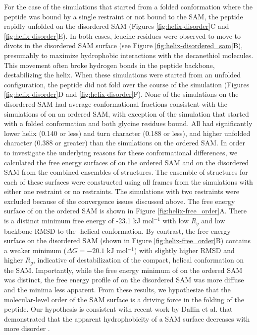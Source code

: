 For the case of the simulations that started from a folded conformation where the peptide was bound by a single restraint or not bound to the SAM, the peptide rapidly unfolded on the disordered SAM (Figures \ref{fig:helix-disorder}C and \ref{fig:helix-disorder}E). 
In both cases, leucine residues were observed to move to divots in the disordered SAM surface (see Figure \ref{fig:helix-disordered_sam}B), presumably to maximize hydrophobic interactions with the decanethiol molecules. 
This movement often broke hydrogen bonds in the peptide backbone, destabilizing the helix. 
When these simulations were started from an unfolded configuration, the peptide did not fold over the course of the simulation (Figures \ref{fig:helix-disorder}D and \ref{fig:helix-disorder}F). 
None of the simulations on the disordered SAM had average conformational fractions consistent with the simulations of \pep{} on an ordered SAM, with exception of the simulation that started with a folded conformation and both glycine residues bound. 
All had significantly lower helix (0.140 or less) and turn character (0.188 or less), and higher unfolded character (0.388 or greater) than the simulations on the ordered SAM. 
In order to investigate the underlying reasons for these conformational differences, we calculated the free energy surfaces of \pep{} on the ordered SAM and \pep{} on the disordered SAM from the combined ensembles of structures. 
The ensemble of structures for each of these surfaces were constructed using all frames from the simulations with either one restraint or no restraints. 
The simulations with two restraints were excluded because of the convergence issues discussed above. 
The free energy surface of \pep{} on the ordered SAM is shown in Figure \ref{fig:helix-free_order}A. 
There is a distinct minimum free energy of -23.1 kJ mol$^{-1}$ with low $R_g$ and low backbone RMSD to the \textalpha{}-helical conformation. 
By contrast, the free energy surface on the disordered SAM (shown in Figure \ref{fig:helix-free_order}B) contains a weaker minimum ($\Delta G = -20.1$ kJ mol$^{-1}$) with slightly higher RMSD and higher $R_g$, indicative of destabilization of the compact, helical conformation on the SAM. 
Importantly, while the free energy minimum of \pep{} on the ordered SAM was distinct, the free energy profile of \pep{} on the disordered SAM was more diffuse and the minima less apparent. 
From these results, we hypothesize that the molecular-level order of the SAM surface is a driving force in the folding of the peptide. 
Our hypothesis is consistent with recent work by Dallin et al. that demonstrated that the apparent hydrophobicity of a SAM surface decreases with more disorder \cite{Dallin2019}.   
